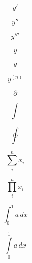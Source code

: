 \documentclass[a4paper,12pt]{article}
\begin{document}
	\[y'\]
	
	\[y''\]
	
	\[y'''\]
	
	\[\dot y\]
	
	\[\ddot y\]
	
	
	\[y^{(n)}\]
	
	\[\partial\]
	
	\[\int\]
	
	
	
	
	
	\[\oint\]
		
	\[\sum_{i}^{n} x_i\]
	
	\[\prod_{i}^{n} x_i\]
	
	\[\int_{0}^{1} a\, dx\]
	
	\[\int\limits_0^1 a\, dx\]
	
\end{document}
